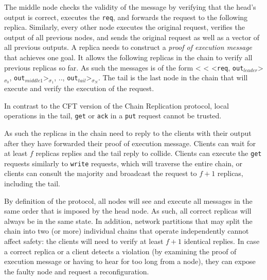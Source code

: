 The middle node checks the validity of the message by verifying that the head's output is correct, executes the {\tt req}, and forwards the request to the following replica. Similarly, every other node executes the original request, verifies the output of all previous nodes, and sends the original request as well as a vector of all previous outputs. A replica needs to construct a {\em proof of execution message} that achieves one goal. It allows the following replicas in the chain to verify all previous replicas so far. As such the messages is of the form < < <{\tt req}, {\tt out$_{leader}$}>$_{\sigma_0}$, {\tt out$_{middle1}$}>$_{\sigma_1}$, .., {\tt out$_{tail}$}>$_{\sigma_N}$. The tail is the last node in the chain that will execute and verify the execution of the request. 


In contrast to the CFT version of the Chain Replication protocol, local operations in the tail, {\tt get} or {\tt ack} in a {\tt put} request cannot be trusted. 

As such the replicas in the chain need to reply to the clients with their output after they have forwarded their proof of execution message. Clients can wait for at least $f$ replicas replies and the tail reply to collide. Clients can execute the {\tt get} requests similarly to {\tt write} requests, which will traverse the entire chain, or clients can consult the majority and broadcast the request to $f+1$ replicas, including the tail. 


 By definition of the protocol, all nodes will see and execute all messages in the same order that is imposed by the head node. As such, all correct replicas will always be in the same state. In addition, network partitions that may split the chain into two (or more) individual chains that operate independently cannot affect safety: the clients will need to verify at least $f+1$ identical replies. In case a correct replica or a client detects a violation (by examining the proof of execution message or having to hear for too long from a node), they can expose the faulty node and request a reconfiguration.

\noindent{}

